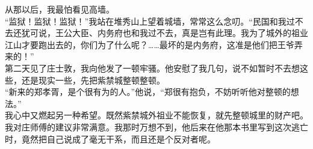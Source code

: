 从那以后，我最怕看见高墙。\\

“监狱！监狱！监狱！”我站在堆秀山上望着城墙，常常这么念叨。“民国和我过不去还犹可说，王公大臣、内务府也和我过不去，真是岂有此理。我为了城外的祖业江山才要跑出去的，你们为了什么呢？……最坏的是内务府，这准是他们把王爷弄来的！”\\

第二天见了庄士敦，我向他发了一顿牢骚。他安慰了我几句，说不如暂时不去想这些，还是现实一些，先把紫禁城整顿整顿。\\

“新来的郑孝胥，是个很有为的人。”他说，“郑很有抱负，不妨听听他对整顿的想法。”\\

我心中又燃起另一种希望。既然紫禁城外祖业不能恢复，就先整顿城里的财产吧。我对庄师傅的建议非常满意。我那时万想不到，他后来在他那本书里写到这次逃亡时，竟然把自己说成了毫无干系，而且还是个反对者呢。\\